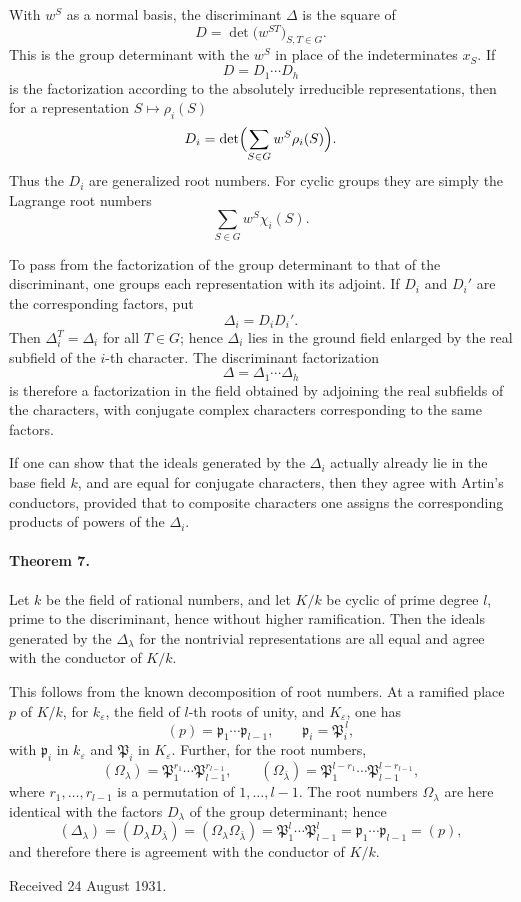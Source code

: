 \documentclass[11pt]{article}
\begin{document}
With \(w^S\) as a normal basis, the discriminant \(\Delta\) is the square of
\[
        D=\det\bigl(w^{ST}\bigr)_{S,T\in G}.
\]
This is the group determinant with the \(w^S\) in place of the indeterminates \(x_S\). If
\[
        D=D_1\cdots D_h
\]
is the factorization according to the absolutely irreducible representations, then for a representation \(S\mapsto \rho_i(S)\)
\[
        D_i=\det\Bigl(\sum_{S\in G} w^S\rho_i(S)\Bigr).
\]
Thus the \(D_i\) are generalized root numbers. For cyclic groups they are simply the Lagrange root numbers
\[
        \sum_{S\in G} w^S\chi_i(S).
\]

To pass from the factorization of the group determinant to that of the discriminant, one groups each representation with its adjoint. If \(D_i\) and \(D_i'\) are the corresponding factors, put
\[
        \Delta_i=D_iD_i'.
\]
Then \(\Delta_i^T=\Delta_i\) for all \(T\in G\); hence \(\Delta_i\) lies in the ground field enlarged by the real subfield of the \(i\)-th character. The discriminant factorization
\[
        \Delta=\Delta_1\cdots\Delta_h
\]
is therefore a factorization in the field obtained by adjoining the real subfields of the characters, with conjugate complex characters corresponding to the same factors.

If one can show that the ideals generated by the \(\Delta_i\) actually already lie in the base field \(k\), and are equal for conjugate characters, then they agree with Artin's conductors, provided that to composite characters one assigns the corresponding products of powers of the \(\Delta_i\).

\paragraph{Theorem 7.}
Let \(k\) be the field of rational numbers, and let \(K/k\) be cyclic of prime degree \(l\), prime to the discriminant, hence without higher ramification. Then the ideals generated by the \(\Delta_\lambda\) for the nontrivial representations are all equal and agree with the conductor of \(K/k\).

This follows from the known decomposition of root numbers. At a ramified place \(p\) of \(K/k\), for \(k_\varepsilon\), the field of \(l\)-th roots of unity, and \(K_\varepsilon\), one has
\[
        (p)=\mathfrak p_1\cdots\mathfrak p_{l-1},\qquad
        \mathfrak p_i=\mathfrak P_i^{\,l},
\]
with \(\mathfrak p_i\) in \(k_\varepsilon\) and \(\mathfrak P_i\) in \(K_\varepsilon\). Further, for the root numbers,
\[
        (\Omega_\lambda)=\mathfrak P_1^{r_1}\cdots
        \mathfrak P_{l-1}^{r_{l-1}},
        \qquad
        (\Omega_{\bar\lambda})=
        \mathfrak P_1^{l-r_1}\cdots \mathfrak P_{l-1}^{l-r_{l-1}},
\]
where \(r_1,\ldots,r_{l-1}\) is a permutation of \(1,\ldots,l-1\). The root numbers \(\Omega_\lambda\) are here identical with the factors \(D_\lambda\) of the group determinant; hence
\[
        (\Delta_\lambda)=(D_\lambda D_{\bar\lambda})
        =(\Omega_\lambda\Omega_{\bar\lambda})
        =\mathfrak P_1^l\cdots\mathfrak P_{l-1}^l
        =\mathfrak p_1\cdots\mathfrak p_{l-1}
        =(p),
\]
and therefore there is agreement with the conductor of \(K/k\).

\begin{center}
Received 24 August 1931.
\end{center}

\clearpage
\end{document}
